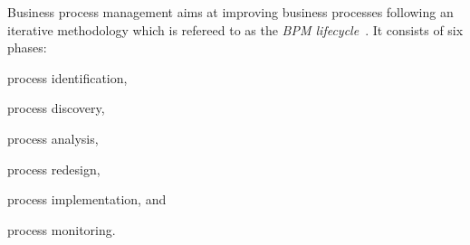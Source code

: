
Business process management aims at improving business processes following an iterative methodology which is refereed to as the \emph{BPM lifecycle}~\citep{Dumas2018}. It consists of six phases:
\begin{inparaenum}[\itshape i)]
	\item process identification,
	\item process discovery, 
	\item process analysis,
	\item process redesign,
	\item process implementation, and
	\item process monitoring.
\end{inparaenum}

